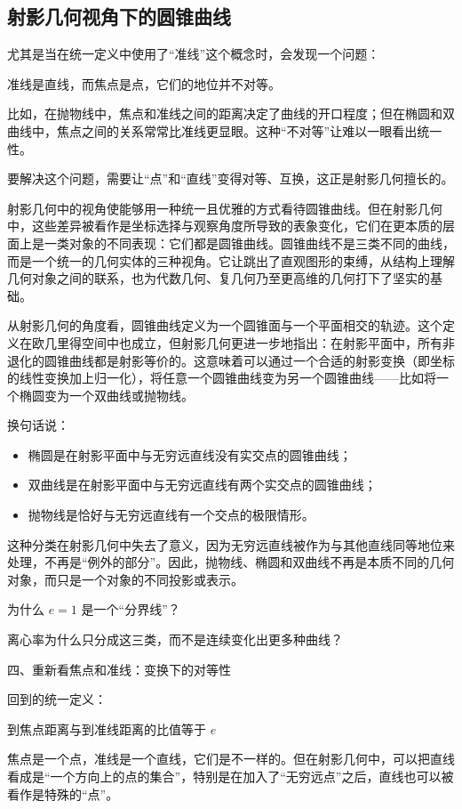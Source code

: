 \subsection{射影几何视角下的圆锥曲线}


尤其是当在统一定义中使用了“准线”这个概念时，会发现一个问题：

准线是直线，而焦点是点，它们的地位并不对等。

比如，在抛物线中，焦点和准线之间的距离决定了曲线的开口程度；但在椭圆和双曲线中，焦点之间的关系常常比准线更显眼。这种“不对等”让难以一眼看出统一性。

要解决这个问题，需要让“点”和“直线”变得对等、互换，这正是射影几何擅长的。




射影几何中的视角使能够用一种统一且优雅的方式看待圆锥曲线。但在射影几何中，这些差异被看作是坐标选择与观察角度所导致的表象变化，它们在更本质的层面上是一类对象的不同表现：它们都是圆锥曲线。圆锥曲线不是三类不同的曲线，而是一个统一的几何实体的三种视角。它让跳出了直观图形的束缚，从结构上理解几何对象之间的联系，也为代数几何、复几何乃至更高维的几何打下了坚实的基础。

从射影几何的角度看，圆锥曲线定义为一个圆锥面与一个平面相交的轨迹。这个定义在欧几里得空间中也成立，但射影几何更进一步地指出：在射影平面中，所有非退化的圆锥曲线都是射影等价的。这意味着可以通过一个合适的射影变换（即坐标的线性变换加上归一化），将任意一个圆锥曲线变为另一个圆锥曲线——比如将一个椭圆变为一个双曲线或抛物线。

换句话说：
\begin{itemize}
\item 椭圆是在射影平面中与无穷远直线没有实交点的圆锥曲线；
\item 双曲线是在射影平面中与无穷远直线有两个实交点的圆锥曲线；
\item 抛物线是恰好与无穷远直线有一个交点的极限情形。
\end{itemize}

这种分类在射影几何中失去了意义，因为无穷远直线被作为与其他直线同等地位来处理，不再是“例外的部分”。因此，抛物线、椭圆和双曲线不再是本质不同的几何对象，而只是一个对象的不同投影或表示。


为什么 $e=1$ 是一个“分界线”？

离心率为什么只分成这三类，而不是连续变化出更多种曲线？

四、重新看焦点和准线：变换下的对等性

回到的统一定义：

到焦点距离与到准线距离的比值等于 $e$

焦点是一个点，准线是一个直线，它们是不一样的。但在射影几何中，可以把直线看成是“一个方向上的点的集合”，特别是在加入了“无穷远点”之后，直线也可以被看作是特殊的“点”。

